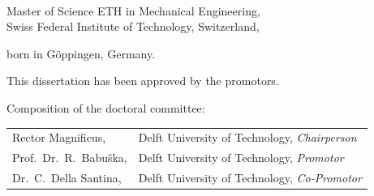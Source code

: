 \begin{titlepage}
\begin{center}
\makeatletter
{\Large\titlefont\bfseries\@firstname\ \titleshape{\MakeUppercase{\@lastname}}}
\makeatother

\bigskip
\bigskip

Master of Science ETH in Mechanical Engineering, \\
Swiss Federal Institute of Technology, Switzerland,

born in Göppingen, Germany.

\vspace*{2\bigskipamount}

\end{center}

\clearpage
\thispagestyle{empty}

\noindent This dissertation has been approved by the promotors.


\bigskip
\noindent Composition of the doctoral committee:

\medskip\noindent
\begin{tabular}{p{4.5cm}l}
    Rector Magnificus, & Delft University of Technology, \emph{Chairperson} \\
    Prof.\ Dr.\ R.\ Babu\v{s}ka, & Delft University of Technology, \emph{Promotor} \\
    Dr.\ C.\ Della Santina, & Delft University of Technology, \emph{Co-Promotor} \\


\end{tabular}
\end{titlepage}
